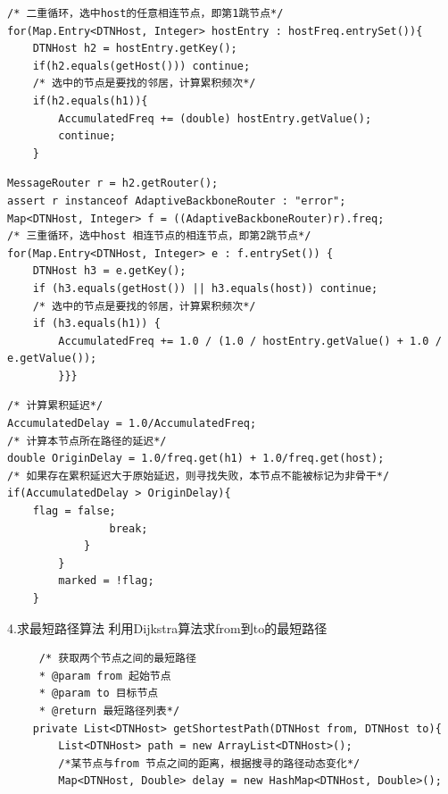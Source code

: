 \documentclass[12pt,aspectratio=43,table]{beamer}
\begin{document}
\begin{frame}[fragile]
\begin{lstlisting}
/* 二重循环，选中host的任意相连节点，即第1跳节点*/
for(Map.Entry<DTNHost, Integer> hostEntry : hostFreq.entrySet()){
    DTNHost h2 = hostEntry.getKey();
    if(h2.equals(getHost())) continue;
    /* 选中的节点是要找的邻居，计算累积频次*/
    if(h2.equals(h1)){
        AccumulatedFreq += (double) hostEntry.getValue();
        continue;
    }
\end{lstlisting}
\end{frame}

\begin{frame}[fragile]
\begin{lstlisting}
MessageRouter r = h2.getRouter();
assert r instanceof AdaptiveBackboneRouter : "error";
Map<DTNHost, Integer> f = ((AdaptiveBackboneRouter)r).freq;
/* 三重循环，选中host 相连节点的相连节点，即第2跳节点*/
for(Map.Entry<DTNHost, Integer> e : f.entrySet()) {
    DTNHost h3 = e.getKey();
    if (h3.equals(getHost()) || h3.equals(host)) continue;
    /* 选中的节点是要找的邻居，计算累积频次*/
    if (h3.equals(h1)) {
        AccumulatedFreq += 1.0 / (1.0 / hostEntry.getValue() + 1.0 / e.getValue());
        }}}
\end{lstlisting}
\end{frame}

\begin{frame}[fragile]
\begin{lstlisting}
/* 计算累积延迟*/
AccumulatedDelay = 1.0/AccumulatedFreq;
/* 计算本节点所在路径的延迟*/
double OriginDelay = 1.0/freq.get(h1) + 1.0/freq.get(host);
/* 如果存在累积延迟大于原始延迟，则寻找失败，本节点不能被标记为非骨干*/
if(AccumulatedDelay > OriginDelay){
    flag = false;
                break;
            }
        }
        marked = !flag;
    }
\end{lstlisting}
\end{frame}











\begin{frame}[fragile]{\small4.求最短路径算法}
利用Dijkstra算法求from到to的最短路径
\begin{lstlisting}
     /* 获取两个节点之间的最短路径
     * @param from 起始节点
     * @param to 目标节点
     * @return 最短路径列表*/
    private List<DTNHost> getShortestPath(DTNHost from, DTNHost to){
        List<DTNHost> path = new ArrayList<DTNHost>();
        /*某节点与from 节点之间的距离，根据搜寻的路径动态变化*/
        Map<DTNHost, Double> delay = new HashMap<DTNHost, Double>();
\end{lstlisting}
\end{frame}
\end{document}
